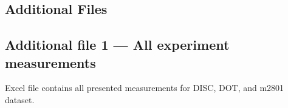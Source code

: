 \documentclass{bmcart}
\begin{document}
\begin{backmatter}

\section*{Additional Files}
  \subsection*{Additional file 1 --- All experiment measurements}
   Excel file contains all presented measurements for DISC, DOT, and m2801 dataset.

\end{backmatter}
\end{document}
